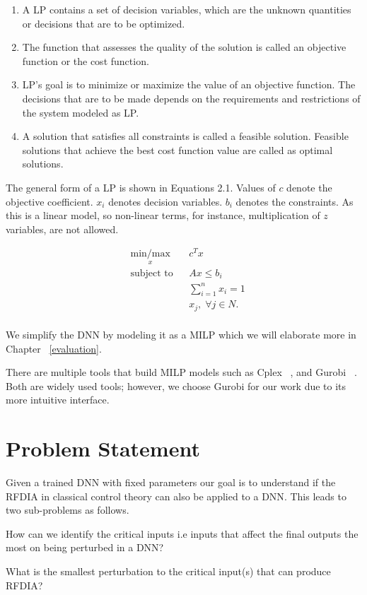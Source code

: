 \begin{enumerate}
	\item A \ac{LP} contains a set of decision variables, which are the unknown quantities or decisions that are to be optimized. 
	\item The function that assesses the quality of the solution is called an objective function or the cost function.
	\item \ac{LP}'s goal is to minimize or maximize the value of an objective function. 
	The decisions that are to be made depends on the requirements and restrictions of the  system modeled as \ac{LP}.
	\item A solution that satisfies all constraints is called a feasible solution. 
	Feasible solutions that achieve the best cost function value are called as optimal solutions. 
\end{enumerate}


The general form of a \ac{LP}  is shown in Equations 2.1. 
Values of $c$ denote the objective coefficient. 
$x_i$ denotes decision variables.
$b_i$ denotes the constraints.
As this is a linear model, so non-linear terms, for instance, multiplication of $z$ variables, are not allowed. 

\begin{equation}
\begin{aligned}
& \underset{x}{\text{min/max}}
& & c^T x \\
& \text{subject to} & &  Ax \leq b_i \\
& & &  \sum_{i=1}^{n} x_i =1 \\
& & &  x_j, \; \forall j \in N. \\
\end{aligned}
\end{equation}


We simplify the \ac{DNN} by modeling it as a \ac{MILP} which we will elaborate more in Chapter ~\ref{evaluation}.  

There are multiple tools that build \ac{MILP} models such as Cplex ~\cite{cplex}, and Gurobi ~\cite{gurobi}.
Both are widely used tools; however, we choose Gurobi for our work due to its more intuitive interface.  



\section{Problem Statement}
\label{problemstatement}

Given a trained DNN with fixed parameters our goal is to understand if the  \ac*{RFDIA} in classical control theory can also be applied to a \ac{DNN}.
This leads to two sub-problems as follows.

\begin{problem}
	How can we identify the critical inputs i.e inputs that  affect the final outputs the most on being perturbed in a \ac{DNN}?
\end{problem}

\begin{problem}
	What is the smallest perturbation to the critical input(s) that can produce \ac{RFDIA}?
\end{problem}




